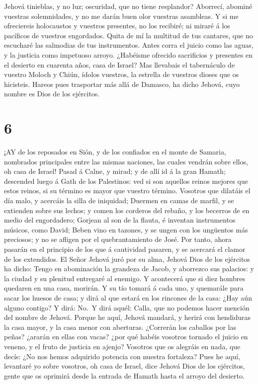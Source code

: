Jehová tinieblas, y no luz; oscuridad, que no tiene resplandor?
 Aborrecí, abominé vuestras solemnidades, y no me darán
buen olor vuestras asambleas.  Y si me ofreciereis
holocaustos y vuestros presentes, no los recibiré; ni miraré á los
pacíficos de vuestros engordados.  Quita de mí la multitud
de tus cantares, que no escucharé las salmodias de tus instrumentos.
 Antes corra el juicio como las aguas, y la justicia como
impetuoso arroyo.  ¿Habéisme ofrecido sacrificios y
presentes en el desierto en cuarenta años, casa de Israel? 
Mas llevabais el tabernáculo de vuestro Moloch y Chiún, ídolos vuestros,
la estrella de vuestros dioses que os hicisteis.  Hareos
pues trasportar más allá de Damasco, ha dicho Jehová, cuyo nombre es
Dios de los ejércitos.

\hypertarget{section-5}{%
\section{6}\label{section-5}}

 ¡AY de los reposados en Sión, y de los confiados en el
monte de Samaria, nombrados principales entre las mismas naciones, las
cuales vendrán sobre ellos, oh casa de Israel!  Pasad á
Calne, y mirad; y de allí id á la gran Hamath; descended luego á Gath de
los Palestinos: ved si son aquellos reinos mejores que estos reinos, si
su término es mayor que vuestro término.  Vosotros que
dilatáis el día malo, y acercáis la silla de iniquidad; 
Duermen en camas de marfil, y se extienden sobre sus lechos; y comen los
corderos del rebaño, y los becerros de en medio del engordadero;
 Gorjean al son de la flauta, é inventan instrumentos
músicos, como David;  Beben vino en tazones, y se ungen con
los ungüentos más preciosos; y no se afligen por el quebrantamiento de
José.  Por tanto, ahora pasarán en el principio de los que á
cautividad pasaren, y se acercará el clamor de los extendidos.
 El Señor Jehová juró por su alma, Jehová Dios de los
ejércitos ha dicho: Tengo en abominación la grandeza de Jacob, y
aborrezco sus palacios: y la ciudad y su plenitud entregaré al enemigo.
 Y acontecerá que si diez hombres quedaren en una casa,
morirán.  Y su tío tomará á cada uno, y quemarále para
sacar los huesos de casa; y dirá al que estará en los rincones de la
casa: ¿Hay aún alguno contigo? Y dirá: No.~Y dirá aquél: Calla, que no
podemos hacer mención del nombre de Jehová.  Porque he
aquí, Jehová mandará, y herirá con hendiduras la casa mayor, y la casa
menor con aberturas.  ¿Correrán los caballos por las peñas?
¿ararán en ellas con vacas? ¿por qué habéis vosotros tornado el juicio
en veneno, y el fruto de justicia en ajenjo?  Vosotros que
os alegráis en nada, que decís: ¿No nos hemos adquirido potencia con
nuestra fortaleza?  Pues he aquí, levantaré yo sobre
vosotros, oh casa de Israel, dice Jehová Dios de los ejércitos, gente
que os oprimirá desde la entrada de Hamath hasta el arroyo del desierto.

